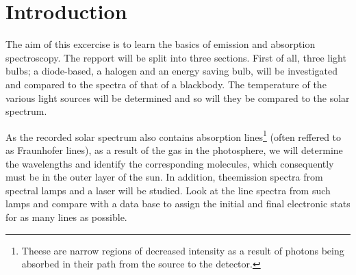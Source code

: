 \section{Introduction}

The aim of this excercise is to learn the basics of emission and absorption
spectroscopy. The repport will be split into three sections. First of all,
three light bulbs; a diode-based, a halogen and an energy saving bulb, will be
investigated and compared to the spectra of that of a blackbody. The
temperature of the various light sources will be determined and so will they be
compared to the solar spectrum. 

As the recorded solar spectrum also contains absorption lines\footnote{Theese
    are narrow regions of decreased intensity as a result of photons being
absorbed in their path from the source to the detector.} (often reffered to as
Fraunhofer lines), as a result of the gas in the photosphere, we will determine
the wavelengths and identify the corresponding molecules, which consequently
must be in the outer layer of the sun.  In addition, theemission spectra from
spectral lamps and a laser will be studied. 
Look at the line spectra from such lamps and compare with a data base to assign
the initial and final electronic stats for as many lines as possible. 



